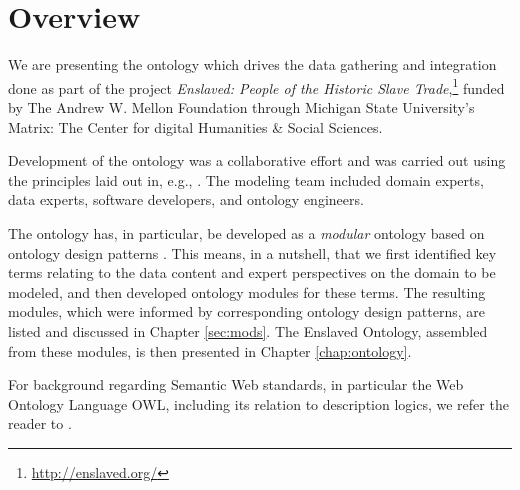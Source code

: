 \chapter{Overview}

We are presenting the ontology which drives the data gathering and integration done as part of the project \emph{Enslaved: People of the Historic Slave Trade},\footnote{\url{http://enslaved.org/}} funded by The Andrew W. Mellon Foundation through Michigan State University's Matrix: The Center for digital Humanities \&{} Social Sciences.

Development of the ontology was a collaborative effort and was carried out using the principles laid out in, e.g., \cite{KrisnadhiHJHACC15,KrisnadhiH16,KrisnadhiKHARJ16}. The modeling team included domain experts, data experts, software developers, and ontology engineers. 

The ontology has, in particular, be developed as a \emph{modular} ontology \cite{HitzlerGJKP17} based on ontology design patterns \cite{HGJKP2016}. This means, in a nutshell, that we first identified key terms relating to the data content and expert perspectives on the domain to be modeled, and then developed ontology modules for these terms. The resulting modules, which were informed by corresponding ontology design patterns, are listed and discussed in Chapter \ref{sec:mods}. The Enslaved Ontology, assembled from these modules, is then presented in Chapter \ref{chap:ontology}.

For background regarding Semantic Web standards, in particular the Web Ontology Language OWL, including its relation to description logics, we refer the reader to \cite{owl2-primer, FOST}.


